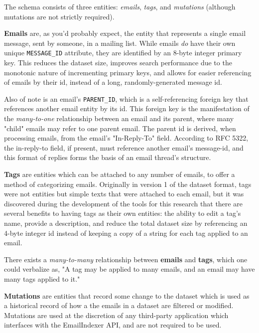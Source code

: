\documentclass[a4paper, 12pt]{article}
\begin{document}
			The schema consists of three entities: \textit{emails}, \textit{tags}, and \textit{mutations} (although mutations are not strictly required).
			
			\textbf{Emails} are, as you'd probably expect, the entity that represents a single email message, sent by someone, in a mailing list. While emails \textit{do} have their own unique \texttt{MESSAGE\_ID} attribute\cite{rfc5322}, they are identified by an 8-byte integer primary key. This reduces the dataset size, improves search performance due to the monotonic nature of incrementing primary keys, and allows for easier referencing of emails by their id, instead of a long, randomly-generated message id.
			
			Also of note is an email's \texttt{PARENT\_ID}, which is a self-referencing foreign key that references another email entity by its id. This foreign key is the manifestation of the \textit{many-to-one} relationship between an email and its parent, where many "child" emails may refer to one parent email. The parent id is derived, when processing emails, from the email's "In-Reply-To" field. According to RFC 5322, the in-reply-to field, if present, must reference another email's message-id, and this format of replies forms the basis of an email thread's structure\cite{rfc5322}.
			
			\textbf{Tags} are entities which can be attached to any number of emails, to offer a method of categorizing emails. Originally in version 1 of the dataset format, tags were not entities but simple texts that were attached to each email, but it was discovered during the development of the tools for this research that there are several benefits to having tags as their own entities: the ability to edit a tag's name, provide a description, and reduce the total dataset size by referencing an 4-byte integer id instead of keeping a copy of a string for each tag applied to an email.
			
			There exists a \textit{many-to-many} relationship between \textbf{emails} and \textbf{tags}, which one could verbalize as, "A tag may be applied to many emails, and an email may have many tags applied to it."
			
			\textbf{Mutations} are entities that record some change to the dataset which is used as a historical record of how a the emails in a dataset are filtered or modified. Mutations are used at the discretion of any third-party application which interfaces with the EmailIndexer API, and are not required to be used.
			
\end{document}
